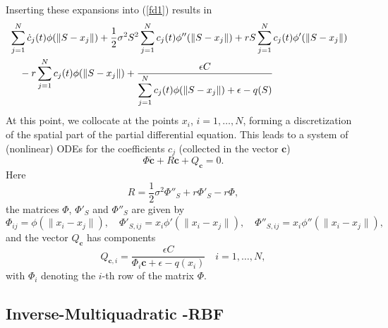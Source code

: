 \documentclass[12pt]{article}
\numberwithin{equation}{subsection} %
\begin{document}
Inserting these expansions into (\ref{fd1}) results in
\begin{eqnarray*}
& \displaystyle \sum_{j=1}^N \dot{c}_j(t) \phi(\|S-x_j\|) +
\frac{1}{2}\sigma^2 S^2 \sum_{j=1}^N c_j(t) \phi''(\|S-x_j\|) +
rS\sum_{j=1}^N c_j(t) \phi'(\|S-x_j\|)& \cr & \displaystyle \quad -
r \sum_{j=1}^N c_j(t) \phi(\|S-x_j\|) +\frac{\epsilon C
}{\displaystyle \sum_{j=1}^N c_j(t) \phi(\|S-x_j\|) + \epsilon -
q(S)}
\end{eqnarray*}
At this point, we collocate at the points $x_i$, $i=1,\ldots,N$,
forming a discretization of the spatial part of the partial
differential equation. This leads to a system of (nonlinear) ODEs
for the coefficients $c_j$ (collected in the vector $\textbf{c}$)
$$
\Phi \dot{\textbf{c}} + R \textbf{c} + Q_{\textbf{c}} = 0.
$$
Here
$$
R = \frac{1}{2} \sigma^2 \Phi''_S + r \Phi'_S - r \Phi,
$$
the matrices $\Phi$, $\Phi'_S$ and $\Phi''_S$ are given by
$$
\Phi_{ij} = \phi(\|x_i-x_j\|), \quad \Phi'_{S,ij} =
x_i\phi'(\|x_i-x_j\|), \quad \Phi''_{S,ij} = x_i\phi''(\|x_i-x_j\|),
$$
and the vector $Q_{\textbf{c}}$ has components
$$
 Q_{\textbf{c},i}=\frac{\epsilon C}{\Phi_i\textbf{c}+\epsilon-q(x_i)} \quad  i=1,\ldots,N,
$$
with $\Phi_i$ denoting the $i$-th row of the matrix $\Phi$.




\subsection{Inverse-Multiquadratic -RBF }
\end{document}
